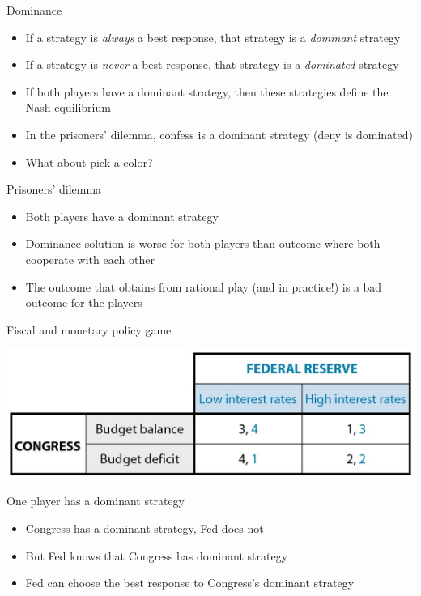 \documentclass[10pt]{beamer}
\begin{document}
\begin{frame}[label={sec:org7b31583}]{}
\alert{Dominance}
\begin{itemize}
\item If a strategy is \emph{always} a best response, that strategy is a \emph{dominant} strategy
\item If a strategy is \emph{never} a best response, that strategy is a \emph{dominated} strategy
\item If both players have a dominant strategy, then these strategies define the Nash equilibrium
\item In the prisoners' dilemma, confess is a dominant strategy (deny is dominated)
\item What about pick a color?
\end{itemize}
\end{frame}

\begin{frame}[label={sec:orge55f229}]{}
\alert{Prisoners' dilemma}
\begin{itemize}
\item Both players have a dominant strategy
\item Dominance solution is worse for both players than outcome where both cooperate with each other
\item The outcome that obtains from rational play (and in practice!) is a bad outcome for the players
\end{itemize}
\end{frame}

\begin{frame}[label={sec:orgdfbe306}]{Fiscal and monetary policy game}
\begin{center}
\includegraphics[width=.75\textwidth]{./img/GAMES4_FIG04.05.jpg}
\end{center}
\end{frame}

\begin{frame}[label={sec:org32eef70}]{}
\alert{One player has a dominant strategy}
\begin{itemize}
\item Congress has a dominant strategy, Fed does not
\item But Fed knows that Congress has dominant strategy
\item Fed can choose the best response to Congress's dominant strategy
\end{itemize}
\end{frame}
\end{document}
